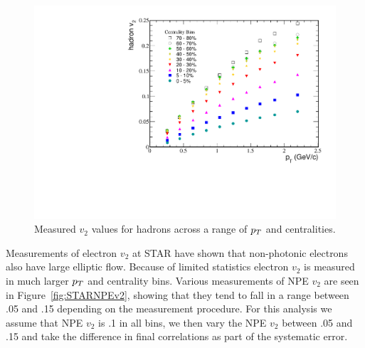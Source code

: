 \begin{figure}[htbp]
\begin{center}
\includegraphics[scale=.8]{Plots/Correlations/STAR_hadron_v2.pdf}
\end{center}
\caption[STAR measured hadron $v_2$]{Measured $v_2$ values for hadrons across a range of $p_{T}$ and centralities.}
\label{fig:STARHadv2}
\end{figure}

Measurements of electron $v_2$ at STAR have shown that non-photonic electrons also have large elliptic flow. Because of limited statistics electron $v_2$ is measured in much larger $p_{T}$ and centrality bins. Various measurements of NPE $v_2$ are seen in Figure~\ref{fig:STARNPEv2}, showing that they tend to fall in a range between .05 and .15 depending on the measurement procedure. For this analysis we assume that NPE $v_2$ is .1 in all bins, we then vary the NPE $v_2$ between .05 and .15 and take the difference in final correlations as part of the systematic error. 

